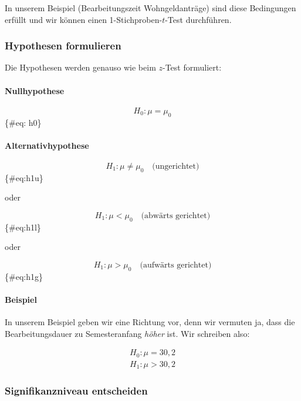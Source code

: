 \documentclass[
  ngerman,
]{article}
\begin{document}
In unserem Beispiel (Bearbeitungszeit Wohngeldanträge) sind diese Bedingungen erfüllt und wir können einen 1-Stichproben-\(t\)-Test durchführen.

\hypertarget{hypothesen-formulieren-1}{%
\subsubsection{Hypothesen formulieren}\label{hypothesen-formulieren-1}}

Die Hypothesen werden genauso wie beim \(z\)-Test formuliert:

\hypertarget{nullhypothese-1}{%
\paragraph{Nullhypothese}\label{nullhypothese-1}}

\[
H_0 : \mu = \mu_0
\]\{\#eq: h0\}

\hypertarget{alternativhypothese-1}{%
\paragraph{Alternativhypothese}\label{alternativhypothese-1}}

\[
H_1 : \mu \neq \mu_0 \quad \textrm{(ungerichtet)}
\]\{\#eq:h1u\}

oder

\[
H_1 : \mu < \mu_0 \quad \textrm{(abwärts gerichtet)}
\]\{\#eq:h1l\}

oder

\[
H_1 : \mu > \mu_0 \quad \textrm{(aufwärts gerichtet)}
\]\{\#eq:h1g\}

\hypertarget{beispiel-7}{%
\paragraph{Beispiel}\label{beispiel-7}}

In unserem Beispiel geben wir eine Richtung vor, denn wir vermuten ja, dass die Bearbeitungsdauer zu Semesteranfang \emph{höher} ist. Wir schreiben also:

\[\begin{aligned}
H_0: \mu = 30{,}2\\
H_1: \mu>30{,}2
\end{aligned}\]

\hypertarget{signifikanzniveau-entscheiden-1}{%
\subsubsection{Signifikanzniveau entscheiden}\label{signifikanzniveau-entscheiden-1}}
\end{document}
